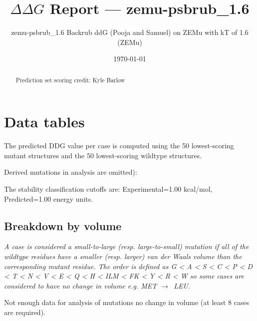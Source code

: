 \documentclass[10pt, letterpaper, oneside, titlepage, landscape]{scrreprt}
\title{$\Delta\Delta G$ Report --- zemu-psbrub\_1.6}
\subtitle{zemu-psbrub\_1.6 Backrub ddG (Pooja and Samuel) on ZEMu with kT of 1.6 (ZEMu)}
\date{\today}
\begin{document}
\maketitle
\tableofcontents

\clearpage

\begin{abstract}
Prediction set scoring credit: Kyle Barlow

\end{abstract}


\clearpage

\section{Data tables}

The predicted DDG value per case is computed using the 50 lowest-scoring mutant structures and the 50 lowest-scoring wildtype structures.

Derived mutations in analysis are omitted):

The stability classification cutoffs are: Experimental=1.00 kcal/mol, Predicted=1.00 energy units.
\subsection{Breakdown by volume}
\textit{A case is considered a small-to-large (resp. large-to-small) mutation if all of the wildtype residues have a smaller (resp. larger) van der Waals volume than the corresponding mutant residue. The order is defined as G < A < S < C < P < D < T < N < V < E < Q < H < ILM < FK < Y < R < W so some cases are considered to have no change in volume e.g. MET $\rightarrow$\ LEU.}

Not enough data for analysis of mutations no change in volume (at least 8 cases are required).
\end{document}
